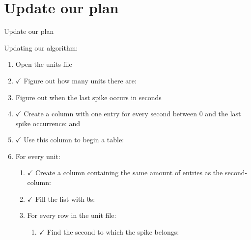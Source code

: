 \documentclass[aspectratio=169]{beamer}
\begin{document}
\section{Update our plan}
\begin{frame}{Update our plan}

Updating our algorithm:

\begin{enumerate}
\item {Open the units-file}
\item {\begin{math} \checkmark \end{math}
	Figure out how many units there are:
}
\item {Figure out when the last spike occurs in seconds}
\item {\begin{math} \checkmark \end{math}
	Create a column with one entry for every second between 0 and the last spike occurrence:
	 and 
}
\item {\begin{math} \checkmark \end{math}
	Use this column to begin a table:
}
\item {For every unit:}
\begin{enumerate}
	\item {\begin{math} \checkmark \end{math}
		Create a column containing the same amount of entries as the second-column:
	}
	\item {\begin{math} \checkmark \end{math}
		Fill the list with 0s:
	}
	\item {For every row in the unit file:}
	\begin{enumerate}
		\item {\begin{math} \checkmark \end{math}
			Find the second to which the spike belongs:
}
\end{enumerate}
\end{enumerate}
\end{enumerate}
\end{frame}
\end{document}
